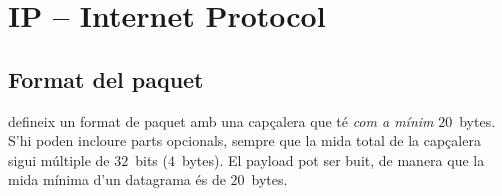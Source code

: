 % 







\section{IP -- Internet Protocol}\label{sec:layer3:ip}

\subsection{Format del paquet}\label{sec:layer3:ip:format}

 defineix un format de paquet amb una capçalera 
que té \textit{com a mínim} $20$~bytes. S'hi poden incloure parts opcionals,
sempre que la mida total de la capçalera sigui múltiple de $32$~bits ($4$~bytes).
El payload pot ser buit, de manera que la mida mínima d'un datagrama és de $20$~bytes.\\

